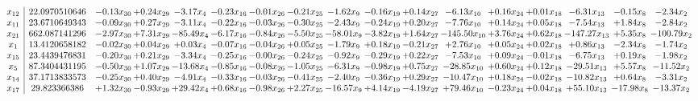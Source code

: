 \documentclass[9pt]{article}
\begin{document}
 \[\begin{array}{c| c c@{\hskip 2pt} c@{\hskip 2pt} c@{\hskip 2pt} c@{\hskip 2pt} c@{\hskip 2pt} c@{\hskip 2pt} c@{\hskip 2pt} c@{\hskip 2pt} c@{\hskip 2pt} c@{\hskip 2pt} c@{\hskip 2pt} c@{\hskip 2pt} c@{\hskip 2pt} c@{\hskip 2pt} c@{\hskip 2pt} }
 x_{12}   &  22.0970510646 & -0.13 x_{30} & +  0.24 x_{29} & -3.17 x_{4} & -0.23 x_{16} & -0.01 x_{26} & -0.21 x_{25} & -1.62 x_{9} & -0.16 x_{19} & +  0.14 x_{27} & -6.13 x_{10} & +  0.16 x_{24} & +  0.01 x_{18} & -6.31 x_{13} & -0.15 x_{8} & -2.34 x_{2}\\
 x_{11}   &  23.6710649343 & -0.09 x_{30} & +  0.27 x_{29} & -3.11 x_{4} & -0.22 x_{16} & -0.03 x_{26} & -0.30 x_{25} & -2.43 x_{9} & -0.24 x_{19} & +  0.20 x_{27} & -7.76 x_{10} & +  0.14 x_{24} & +  0.05 x_{18} & -7.54 x_{13} & +  1.84 x_{8} & -2.84 x_{2}\\
 x_{21}   &  662.087141296 & -2.97 x_{30} & +  7.31 x_{29} & -85.49 x_{4} & -6.17 x_{16} & -0.84 x_{26} & -5.50 x_{25} & -58.01 x_{9} & -3.82 x_{19} & +  1.64 x_{27} & -145.50 x_{10} & +  3.76 x_{24} & +  0.62 x_{18} & -147.27 x_{13} & +  5.35 x_{8} & -100.79 x_{2}\\
 x_{1}   &  13.4120658182 & -0.02 x_{30} & +  0.04 x_{29} & +  0.03 x_{4} & -0.07 x_{16} & -0.04 x_{26} & +  0.05 x_{25} & -1.79 x_{9} & +  0.18 x_{19} & -0.21 x_{27} & +  2.76 x_{10} & +  0.05 x_{24} & +  0.02 x_{18} & +  0.86 x_{13} & -2.34 x_{8} & -1.74 x_{2}\\
 x_{15}   &  23.4439476831 & -0.20 x_{30} & +  0.21 x_{29} & -3.34 x_{4} & -0.25 x_{16} & -0.00 x_{26} & -0.24 x_{25} & -0.92 x_{9} & -0.29 x_{19} & +  0.22 x_{27} & -7.53 x_{10} & +  0.09 x_{24} & -0.01 x_{18} & -6.75 x_{13} & +  0.19 x_{8} & -1.98 x_{2}\\
 x_{5}   &  87.3404431195 & -0.50 x_{30} & +  1.07 x_{29} & -13.68 x_{4} & -0.85 x_{16} & -0.08 x_{26} & -1.05 x_{25} & -6.31 x_{9} & -0.98 x_{19} & +  0.75 x_{27} & -28.85 x_{10} & +  0.60 x_{24} & +  0.12 x_{18} & -29.51 x_{13} & +  5.57 x_{8} & -11.52 x_{2}\\
 x_{14}   &  37.1713833573 & -0.25 x_{30} & +  0.40 x_{29} & -4.91 x_{4} & -0.33 x_{16} & -0.03 x_{26} & -0.41 x_{25} & -2.40 x_{9} & -0.36 x_{19} & +  0.29 x_{27} & -10.47 x_{10} & +  0.18 x_{24} & -0.02 x_{18} & -10.82 x_{13} & +  0.64 x_{8} & -3.31 x_{2}\\
 x_{17}   &  29.823366386 & +  1.32 x_{30} & -0.93 x_{29} & + 29.42 x_{4} & +  0.68 x_{16} & -0.98 x_{26} & +  2.27 x_{25} & -16.57 x_{9} & +  4.14 x_{19} & -4.19 x_{27} & + 79.46 x_{10} & -0.23 x_{24} & +  0.04 x_{18} & + 55.10 x_{13} & -17.98 x_{8} & -13.37 x_{2}\\

\end{array}\]
\end{document}
